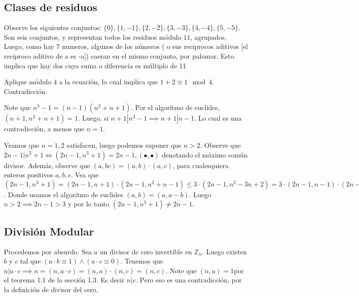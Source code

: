 \subsection{Clases de residuos}

\begin{sol}
	Observe los siguientes conjuntos: $\{0\}, \{1, -1\}, \{2, -2\}, \{3, -3\}, \{4, -4\}, \{5, -5\}$. Son seis conjuntos, y representan todos los residuos m\'odulo $11$, agrupados. Luego, como hay 7 numeros, algunos de los n\'umeros ( o sus reciprocos aditivos [el reciproco aditivo de a es -a])  caeran en el mismo conjunto, por palomar. Esto implica que hay dos cuya suma o diferencia es m\'ultiplo de 11
\end{sol}


\begin{sol}
	Aplique m\'odulo 4 a la ecuaci\'on, lo cual implica que $1 + 2 \equiv 1 \mod 4$. Contradicci\'on.
\end{sol}

\begin{sol}
	Note que $n^3-1 = (n-1)(n^2+n+1)$. Por el algoritmo de euclides, $(n+1, n^2+n+1) = 1$. Luego, si $n+1 | n^3-1 \implies n+1|n-1$. Lo cual es una contradicci\'on, a menos que $n = 1$.
\end{sol}

\begin{sol}
	Veamos que $n = 1, 2$ satisfacen, luego podemos suponer que  $n> 2$. Observe que $2n-1| n^3+1 \iff (2n-1, n^3+1) = 2n-1, (\bullet, \bullet)$ denotando el m\'aximo com\'un divisor. Adem\'as, observe que $(a,bc) = (a,b)\cdot (a,c)$, para cualesquiera enteros positivos $a, b, c$. Vea que $(2n-1, n^3+1) = (2n-1, n+1)\cdot (2n-1, n^2+n-1) \leq 3\cdot (2n-1, n^2-3n+2) = 3\cdot (2n-1, n-1)\cdot(2n-1, n-2) = 3$. Donde usamos el algoritmo de euclides $(a,b) = (a,a-b)$. Luego $n>2 \implies 2n-1 > 3$ y por lo tanto $ (2n-1, n^3+1) \neq 2n-1$. 
\end{sol}


\subsection{Divisi\'on Modular}
\begin{sol}
	Procedemos por absurdo. Sea $a$ un divisor de cero invertible en $\mathbb{Z}_{n}$. Luego existen $b$ y $c$ tal que $(a\cdot b \equiv 1) \land (a\cdot c \equiv 0)$. Tenemos que $n|a\cdot c \implies n = (n, a\cdot c) = (n,a)\cdot (n,c) = (n,c)$. Note que $(n,a) = 1 $por el teorema 1.1 de la secci\'on 1.3. Es decir $n|c$. Pero eso es una contradicci\'on, por la definici\'on de divisor del cero.
\end{sol}

